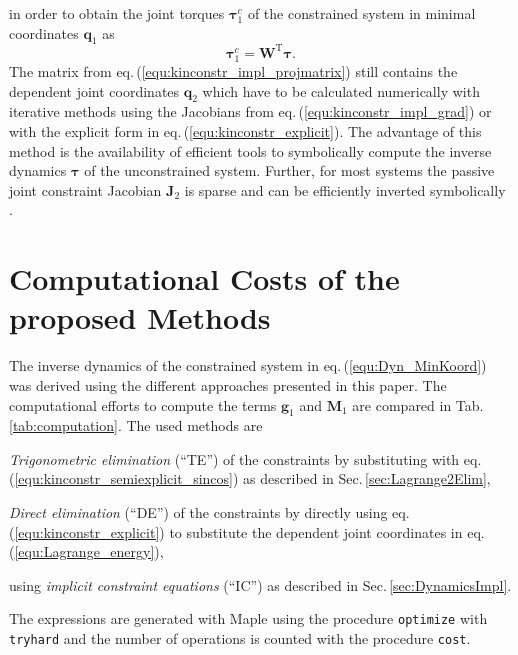 \documentclass{svproc}
\newcommand{\bm}[1]{\boldsymbol{#1}}
\newcommand{\transp}[0]{{\mathrm{T}}}
\begin{document}
%
in order to obtain the joint torques $\bm{\tau}^c_1$ of the constrained system in minimal coordinates $\bm{q}_1$ as
\vspace{-0.15cm}
%
\begin{equation}
\bm{\tau}^{c}_{1} = \bm{W}^\transp \bm{\tau}.
\label{equ:tau_projection}
\end{equation}
%
The matrix from eq.\,(\ref{equ:kinconstr_impl_projmatrix}) still contains the dependent joint coordinates $\bm{q}_2$ which have to be calculated numerically with iterative methods using the Jacobians from eq.\,(\ref{equ:kinconstr_impl_grad}) or with the explicit form in eq.\,(\ref{equ:kinconstr_explicit}).
The advantage of this method is the availability of efficient tools to symbolically compute the inverse dynamics $\bm{\tau}$ of the unconstrained system.
Further, for most systems the passive joint constraint Jacobian $\bm{J}_2$ is sparse and can be efficiently inverted symbolically \cite{ParkChoPlo1999}.

\vspace{-0.2cm}
\section{Computational Costs of the proposed Methods}
\label{sec:simulation}

The inverse dynamics  of the constrained system in eq.\,(\ref{equ:Dyn_MinKoord}) was derived using the different approaches presented in this paper.
The computational efforts to compute the terms $\bm{g}_1$ and $\bm{M}_1$ are compared in Tab.\,\ref{tab:computation}.
The used methods are
%
\begin{compactenum}
    \item \emph{Trigonometric elimination} (``TE'') of the constraints by substituting with eq.\,(\ref{equ:kinconstr_semiexplicit_sincos}) as described in Sec.\,\ref{sec:Lagrange2Elim},
    \item \emph{Direct elimination} (``DE'') of the constraints by directly using eq.\,(\ref{equ:kinconstr_explicit}) to substitute the dependent joint coordinates in eq.\,(\ref{equ:Lagrange_energy}),
    \item using \emph{implicit constraint equations} (``IC'') as described in Sec.\,\ref{sec:DynamicsImpl}.
\end{compactenum}
%
The expressions are generated with Maple using the procedure \texttt{optimize} with \texttt{tryhard} and the number of operations is counted with the procedure \texttt{cost}.
\end{document}
